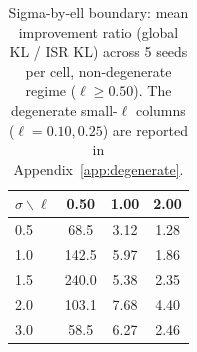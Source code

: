 \begin{table}[htbp]
  \centering
  \caption{Sigma-by-ell boundary: mean improvement ratio (global KL / ISR KL)
  across 5 seeds per cell, non-degenerate regime ($\ell \ge 0.50$).
  The degenerate small-$\ell$ columns ($\ell=0.10, 0.25$) are reported in
  Appendix~\ref{app:degenerate}.}
  \label{tab:sigma_ell_boundary}
  \small
  \begin{tabular}{lccc}
    \toprule
    $\sigma \backslash \ell$ & 0.50 & 1.00 & 2.00 \\
    \midrule
    0.5 & 68.5 & 3.12 & 1.28 \\
    1.0 & 142.5 & 5.97 & 1.86 \\
    1.5 & 240.0 & 5.38 & 2.35 \\
    2.0 & 103.1 & 7.68 & 4.40 \\
    3.0 & 58.5 & 6.27 & 2.46 \\
    \bottomrule
  \end{tabular}
\end{table}
